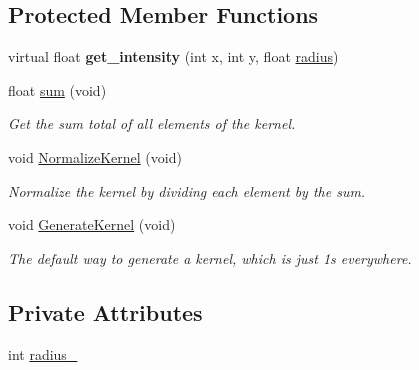 \subsection*{Protected Member Functions}
\begin{DoxyCompactItemize}
\item 
virtual float {\bfseries get\+\_\+intensity} (int x, int y, float \hyperlink{classimage__tools_1_1Kernel_ac834d16a242dd4a15f5f5e4a6dacea01}{radius})\hypertarget{classimage__tools_1_1Kernel_a214a76e32ad4bedf68045f8df423689a}{}\label{classimage__tools_1_1Kernel_a214a76e32ad4bedf68045f8df423689a}

\item 
float \hyperlink{classimage__tools_1_1Kernel_af2c442a9969338d4ede4572526353833}{sum} (void)\hypertarget{classimage__tools_1_1Kernel_af2c442a9969338d4ede4572526353833}{}\label{classimage__tools_1_1Kernel_af2c442a9969338d4ede4572526353833}

\begin{DoxyCompactList}\small\item\em Get the sum total of all elements of the kernel. \end{DoxyCompactList}\item 
void \hyperlink{classimage__tools_1_1Kernel_aac797e48d4e2880752fe805455e68216}{Normalize\+Kernel} (void)\hypertarget{classimage__tools_1_1Kernel_aac797e48d4e2880752fe805455e68216}{}\label{classimage__tools_1_1Kernel_aac797e48d4e2880752fe805455e68216}

\begin{DoxyCompactList}\small\item\em Normalize the kernel by dividing each element by the sum. \end{DoxyCompactList}\item 
void \hyperlink{classimage__tools_1_1Kernel_ad8e455573607e492d945eb37432926fd}{Generate\+Kernel} (void)\hypertarget{classimage__tools_1_1Kernel_ad8e455573607e492d945eb37432926fd}{}\label{classimage__tools_1_1Kernel_ad8e455573607e492d945eb37432926fd}

\begin{DoxyCompactList}\small\item\em The default way to generate a kernel, which is just 1\textquotesingle{}s everywhere. \end{DoxyCompactList}\end{DoxyCompactItemize}
\subsection*{Private Attributes}
\begin{DoxyCompactItemize}
\item 
int \hyperlink{classimage__tools_1_1Kernel_a75493a8e73d0217897d83da1ad30cc82}{radius\+\_\+}
\end{DoxyCompactItemize}



